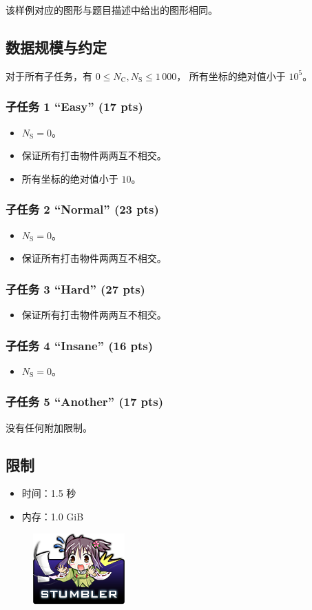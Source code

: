 \documentclass[UTF8, 11pt, a4paper]{article}
\begin{document}
该样例对应的图形与题目描述中给出的图形相同。

\subsection*{数据规模与约定}
对于所有子任务，有 $0 \leq N_\mathrm{C}, N_\mathrm{S} \leq 1\,000$，%
所有坐标的绝对值小于 $10^5$。
\subsubsection*{子任务 1 “Easy” (17 pts)}
\begin{itemize}
    \item $N_\mathrm{S} = 0$。
    \item 保证所有打击物件两两互不相交。
    \item 所有坐标的绝对值小于 $10$。
\end{itemize}
\subsubsection*{子任务 2 “Normal” (23 pts)}
\begin{itemize}
    \item $N_\mathrm{S} = 0$。
    \item 保证所有打击物件两两互不相交。
\end{itemize}
\subsubsection*{子任务 3 “Hard” (27 pts)}
\begin{itemize}
    \item 保证所有打击物件两两互不相交。
\end{itemize}
\subsubsection*{子任务 4 “Insane” (16 pts)}
\begin{itemize}
    \item $N_\mathrm{S} = 0$。
\end{itemize}
\subsubsection*{子任务 5 “Another” (17 pts)}
    没有任何附加限制。

\subsection*{限制}
\begin{itemize}
\item 时间：1.5 秒
\item 内存：1.0 GiB
\end{itemize}

\begin{figure}[h]\centering
\includegraphics[scale=0.55]{stumbler.png}
\end{figure}
\end{document}
